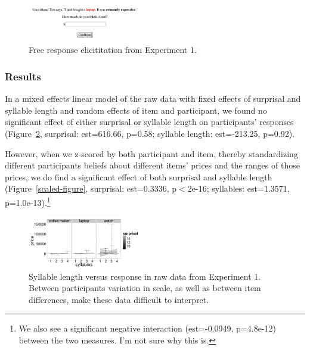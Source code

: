 \documentclass[10pt,letterpaper]{article}
\begin{document}
      \begin{figure}[ht]
      \begin{center}
      \includegraphics[width=0.45\textwidth]{screenshot.png}
      \end{center}
      \caption{Free response elicititation from Experiment 1.}
      \label{screenshot-figure}
      \end{figure}
      
  \subsubsection{Results}
  
  In a mixed effects linear model of the raw data with fixed effects of surprisal and syllable length and random effects of item and participant, we found no significant effect of either surprisal or syllable length on participants' responses (Figure~\ref{raw-figure}, surprisal: est=616.66, p=0.58; syllable length: est=-213.25, p=0.92).
  
  However, when we z-scored by both participant and item, thereby standardizing different participants beliefs about different items' prices and the ranges of those prices, we do find a significant effect of both surprisal and syllable length (Figure~\ref{scaled-figure}, surprisal: est=0.3336, p$<$2e-16; syllables: est=1.3571, p=1.0e-13).\footnote{We also see a significant negative interaction (est=-0.0949, p=4.8e-12) between the two measures. I'm not sure why this is.}
  
  \begin{figure}[ht]
  \begin{center}
  \includegraphics[width=0.45\textwidth]{exp1-raw-syllables.png}
  \end{center}
  \caption{Syllable length versus response in raw data from Experiment 1. Between participants variation in scale, as well as between item differences, make these data difficult to interpret.} 
  \label{raw-figure}
  \end{figure}
  
\end{document}
